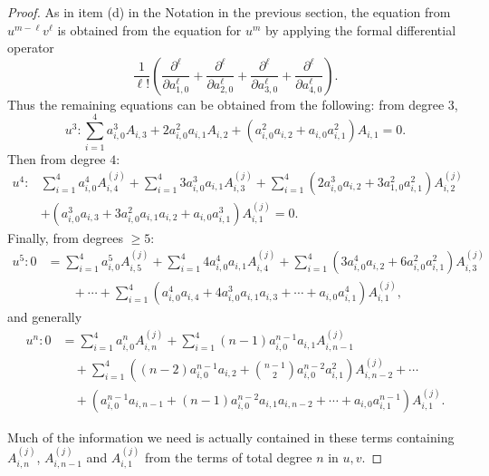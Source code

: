 \documentclass[10pt,a4paper]{amsart}
\begin{document}
\begin{proof}
As in item (d) in the Notation in the previous section, the equation from $u^{m - \ell} v^\ell$
is obtained from the equation for $u^m$ by applying the formal differential operator
$$\frac{1}{\ell!}\left(\frac{\partial^\ell}{\partial a_{1,0}^\ell} +  \frac{\partial^\ell}{\partial a_{2,0}^\ell} + \frac{\partial^\ell}{\partial a_{3,0}^\ell} + \frac{\partial^\ell}{\partial a_{4,0}^\ell}\right).$$
Thus the remaining equations can be obtained from the following:  from degree $3$, 
$$u^3:  \sum_{i=1}^4 a_{i,0}^3 A_{i,3} + 2 a_{i,0}^2 a_{i,1}  A_{i,2} + (a_{i,0}^2 a_{i,2} + a_{i,0} a_{i,1}^2) A_{i,1}  = 0.$$
Then from degree $4$:
\begin{align*}
u^4:  &\sum_{i=1}^4 a_{i,0}^4 A_{i,4}^{(j)} + \sum_{i=1}^4 3 a_{i,0}^3 a_{i,1} A_{i,3}^{(j)} + \sum_{i=1}^4 (2 a_{i,0}^3 a_{i, 2} + 3 a_{1, 0}^2 a_{i,1}^2) A_{i,2}^{(j)}\\
        & + (a_{i,0}^3 a_{i,3} + 3 a_{i,0}^2 a_{i,1}a_{i,2} + a_{i,0} a_{i,1}^3) A_{i,1}^{(j)} = 0.
 \end{align*}
Finally, from degrees $\ge 5$:
\begin{align*}
u^5: 0 &= \sum_{i=1}^4 a_{i,0}^5 A_{i,5}^{(j)} + \sum_{i=1}^4 4 a_{i,0}^4 a_{i,1} A_{i,4}^{(j)} + \sum_{i=1}^4 (3 a_{i,0}^4 a_{i,2} + 6 a_{i,0}^2 a_{i,1}^2) A_{i,3}^{(j)} \\
           &\qquad + \cdots  + \sum_{i=1}^4 (a_{i,0}^4 a_{i,4} + 4 a_{i,0}^3 a_{i,1} a_{i,3} + \cdots + a_{i,0} a_{i,1}^4) A_{i,1}^{(j)},
\end{align*}
and generally
\begin{align}
\label{HigherDegrees}
u^n: 0&= \sum_{i=1}^4 a_{i,0}^n A_{i,n}^{(j)} + \sum_{i=1}^4 (n-1) a_{i,0}^{n-1} a_{i,1} A_{i,n-1}^{(j)}\nonumber \\ 
& \quad + \sum_{i=1}^4 \left((n-2) a_{i,0}^{n-1} a_{i,2} + \binom{n-1}{2}  a_{i,0}^{n-2} a_{i,1}^2\right) A_{i,n-2}^{(j)} + \cdots  \\
& \quad + (a_{i,0}^{n-1} a_{i,n-1} + (n-1) a_{i,0}^{n-2} a_{i,1} a_{i,n-2 }+ \cdots  + a_{i,0} a_{i,1}^{n-1}) A_{i,1}^{(j)}.\nonumber
\end{align}

Much of the information we need is actually contained in these terms containing $A_{i,n}^{(j)}$, $A_{i,n-1}^{(j)}$ and $A_{i,1}^{(j)}$ from the terms of total degree $n$ in $u,v$.  


\end{proof}
\end{document}
